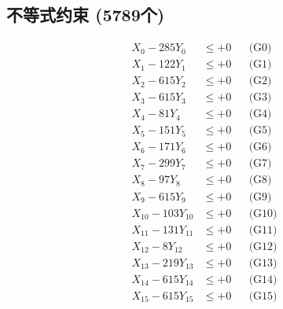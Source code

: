 \documentclass[a4paper,10pt]{article}
\begin{document}
\subsection{不等式约束 (5789个)}

\allowdisplaybreaks
{\small
\begin{align}
\allowbreak
\allowbreak
\allowbreak
\allowbreak
\allowbreak
\allowbreak
\allowbreak
\allowbreak
\allowbreak
\allowbreak
\allowbreak
\allowbreak
\allowbreak
\allowbreak
\allowbreak
\allowbreak
\allowbreak
\allowbreak
\allowbreak
\allowbreak
\allowbreak
\allowbreak
\allowbreak
\allowbreak
\allowbreak
\allowbreak
\allowbreak
\allowbreak
\allowbreak
\allowbreak
\allowbreak
\allowbreak
\allowbreak
\allowbreak
\allowbreak
\allowbreak
\allowbreak
\allowbreak
\allowbreak
\allowbreak
\allowbreak
\allowbreak
\allowbreak
\allowbreak
\allowbreak
\allowbreak
\allowbreak
\allowbreak
\allowbreak
\allowbreak
\allowbreak
\allowbreak
\allowbreak
\allowbreak
\allowbreak
\allowbreak
\allowbreak
\allowbreak
\allowbreak
\allowbreak
\allowbreak
\allowbreak
\allowbreak
\allowbreak
\allowbreak
\allowbreak
\allowbreak
\allowbreak
\allowbreak
\allowbreak
\allowbreak
\allowbreak
\allowbreak
\allowbreak
\allowbreak
\allowbreak
\allowbreak
\allowbreak
X_{0} - 285Y_{0} &\leq +0 && \text{(G0)} \\
\allowbreak
X_{1} - 122Y_{1} &\leq +0 && \text{(G1)} \\
X_{2} - 615Y_{2} &\leq +0 && \text{(G2)} \\
X_{3} - 615Y_{3} &\leq +0 && \text{(G3)} \\
X_{4} - 81Y_{4} &\leq +0 && \text{(G4)} \\
X_{5} - 151Y_{5} &\leq +0 && \text{(G5)} \\
X_{6} - 171Y_{6} &\leq +0 && \text{(G6)} \\
X_{7} - 299Y_{7} &\leq +0 && \text{(G7)} \\
X_{8} - 97Y_{8} &\leq +0 && \text{(G8)} \\
X_{9} - 615Y_{9} &\leq +0 && \text{(G9)} \\
X_{10} - 103Y_{10} &\leq +0 && \text{(G10)} \\
\allowbreak
X_{11} - 131Y_{11} &\leq +0 && \text{(G11)} \\
X_{12} - 8Y_{12} &\leq +0 && \text{(G12)} \\
X_{13} - 219Y_{13} &\leq +0 && \text{(G13)} \\
X_{14} - 615Y_{14} &\leq +0 && \text{(G14)} \\
X_{15} - 615Y_{15} &\leq +0 && \text{(G15)} \\

\end{align}}
\end{document}
